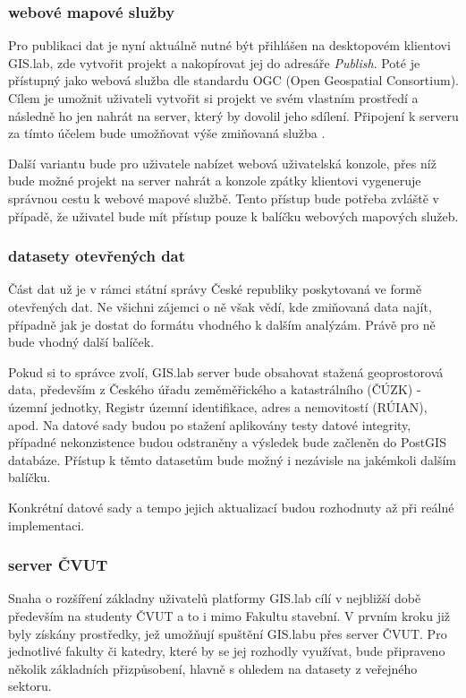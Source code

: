 \subsubsection{webové mapové služby}
Pro publikaci dat je nyní aktuálně nutné být přihlášen na desktopovém
klientovi GIS.lab, zde vytvořit projekt a nakopírovat jej do adresáře
\textit{Publish}. Poté je přístupný jako webová služba dle standardu
OGC (Open Geospatial Consortium). Cílem je umožnit uživateli vytvořit
si projekt ve svém vlastním prostředí a následně ho jen nahrát na
server, který by dovolil jeho sdílení. Připojení k serveru za tímto
účelem bude umožňovat výše zmiňovaná služba .

Další variantu bude pro uživatele nabízet webová uživatelská konzole,
přes níž bude možné projekt na server nahrát a konzole zpátky
klientovi vygeneruje správnou cestu k webové mapové službě. Tento
přístup bude potřeba zvláště v případě, že uživatel bude mít přístup
pouze k balíčku webových mapových služeb.

\subsubsection{datasety otevřených dat}

Část dat už je v rámci státní správy České republiky poskytovaná ve
formě otevřených dat. Ne všichni zájemci o ně však vědí, kde zmiňovaná
data najít, případně jak je dostat do formátu vhodného k dalším
analýzám. Právě pro ně bude vhodný další balíček.

Pokud si to správce zvolí, GIS.lab server bude obsahovat stažená
geoprostorová data, především z Českého úřadu zeměměřického a
katastrálního (ČÚZK) - územní jednotky, Registr územní identifikace,
adres a nemovitostí (RÚIAN), apod. Na datové sady budou po stažení
aplikovány testy datové integrity, případné nekonzistence budou
odstraněny a výsledek bude začleněn do PostGIS databáze. Přístup 
k těmto datasetům bude možný i nezávisle na jakémkoli dalším balíčku.

Konkrétní datové sady a tempo jejich aktualizací budou rozhodnuty až
při reálné implementaci.

\subsubsection{server ČVUT}
Snaha o rozšíření základny uživatelů platformy GIS.lab cílí v
nejbližší době především na studenty ČVUT a to i mimo Fakultu
stavební. V prvním kroku již byly získány prostředky, jež umožňují
spuštění GIS.labu přes server ČVUT. Pro jednotlivé fakulty či katedry,
které by se jej rozhodly využívat, bude připraveno několik základních
přizpůsobení, hlavně s ohledem na datasety z veřejného sektoru.

